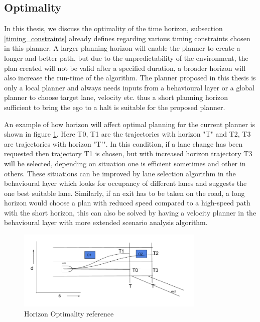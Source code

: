 \subsection{Optimality}
 In this thesis, we discuss the optimality of the time horizon, subsection \ref{timing_constraints} already defines regarding various timing constraints chosen in this planner. A larger planning horizon will enable the planner to create a longer and better path, but due to the unpredictability of the environment, the plan created will not be valid after a specified duration, a broader horizon will also increase the run-time of the algorithm. The planner proposed in this thesis is only a local planner and always needs inputs from a behavioural layer or a global planner to choose target lane, velocity etc. thus a short planning horizon sufficient to bring the ego to a halt is suitable for the proposed planner. 

An example of how horizon will affect optimal planning for the current planner is shown in figure \ref{horizon_optimality}. Here T0, T1 are the trajectories with horizon "T" and T2, T3 are trajectories with horizon "T'". In this condition, if a lane change has been requested then trajectory T1 is chosen, but with increased horizon trajectory T3 will be selected, depending on situation one is efficient sometimes and other in others. These situations can be improved by lane selection algorithm in the behavioural layer which looks for occupancy of different lanes and suggests the one best suitable lane. Similarly, if an exit has to be taken on the road, a long horizon would choose a plan with reduced speed compared to a high-speed path with the short horizon, this can also be solved by having a velocity planner in the behavioural layer with more extended scenario analysis algorithm.  

\begin{figure}
    \centering
    \includegraphics[width=0.8\textwidth]{Images/horizaon_optimality_2.png}
    \caption{Horizon Optimality reference}
    \label{horizon_optimality}
\end{figure}
 
